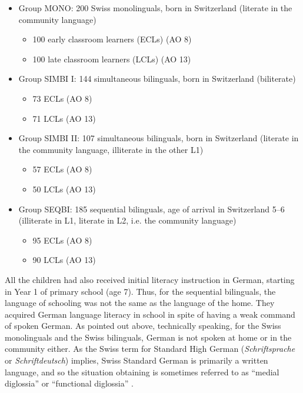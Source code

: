 \documentclass[output=paper,modfonts,nonflat,newtxmath]{langsci/langscibook}
\begin{document}
\begin{itemize}
\item Group MONO: 200 Swiss monolinguals, born in Switzerland (literate in the community language)
  \begin{itemize}
  \item 100 early classroom learners (ECLs) (AO 8)
  \item 100 late classroom learners (LCLs) (AO 13)
  \end{itemize}
\item Group SIMBI I: 144 simultaneous bilinguals, born in Switzerland (biliterate)
  \begin{itemize}
  \item 73 ECLs (AO 8)
  \item 71 LCLs (AO 13)
  \end{itemize}
\item Group SIMBI II: 107 simultaneous bilinguals, born in Switzerland (literate in the community language, illiterate in the other L1)
  \begin{itemize}
  \item 57 ECLs (AO 8)
  \item 50 LCLs (AO 13)
  \end{itemize}
\item Group SEQBI: 185 sequential bilinguals, age of arrival in Switzerland 5--6 (illiterate in L1, literate in L2, i.e. the community language)
  \begin{itemize}
  \item 95 ECLs (AO 8)
  \item 90 LCLs (AO 13)
  \end{itemize}
\end{itemize}

All the children had also received initial literacy instruction in German, starting in Year 1 of primary school (age 7). Thus, for the sequential bilinguals, the language of schooling was not the same as the language of the home. They acquired German language literacy in school in spite of having a weak command of spoken German. As pointed out above, technically speaking, for the Swiss monolinguals and the Swiss bilinguals, German is not spoken at home or in the community either. As the Swiss term for Standard High German (\textit{Schriftsprache} or \textit{Schriftdeutsch}) implies, Swiss Standard German is primarily a written language, and so the situation obtaining is sometimes referred to as ``medial diglossia'' \citep{Kolde1981} or ``functional diglossia'' \citep{Rash1998}.
\end{document}
